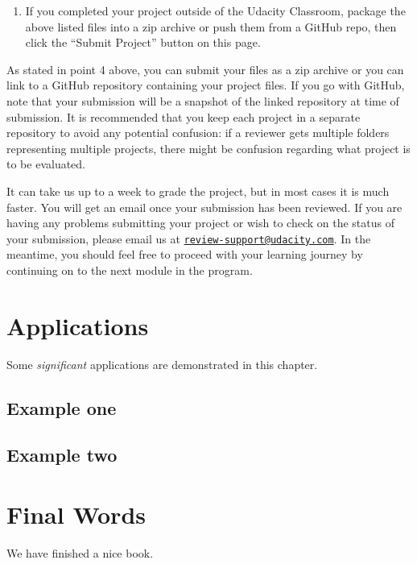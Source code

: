 \documentclass[]{book}
\providecommand{\tightlist}{%
  \setlength{\itemsep}{0pt}\setlength{\parskip}{0pt}}
\begin{document}
\begin{enumerate}
\def\labelenumi{\arabic{enumi}.}
\setcounter{enumi}{3}
\tightlist
\item
  If you completed your project outside of the Udacity Classroom,
  package the above listed files into a zip archive or push them from a
  GitHub repo, then click the ``Submit Project'' button on this page.
\end{enumerate}

As stated in point 4 above, you can submit your files as a zip archive
or you can link to a GitHub repository containing your project files. If
you go with GitHub, note that your submission will be a snapshot of the
linked repository at time of submission. It is recommended that you keep
each project in a separate repository to avoid any potential confusion:
if a reviewer gets multiple folders representing multiple projects,
there might be confusion regarding what project is to be evaluated.

It can take us up to a week to grade the project, but in most cases it
is much faster. You will get an email once your submission has been
reviewed. If you are having any problems submitting your project or wish
to check on the status of your submission, please email us at
\href{mailto:review-support@udacity.com}{\nolinkurl{review-support@udacity.com}}.
In the meantime, you should feel free to proceed with your learning
journey by continuing on to the next module in the program.

\chapter{Applications}\label{applications}

Some \emph{significant} applications are demonstrated in this chapter.

\section{Example one}\label{example-one}

\section{Example two}\label{example-two}

\chapter{Final Words}\label{final-words}

We have finished a nice book.


\end{document}
